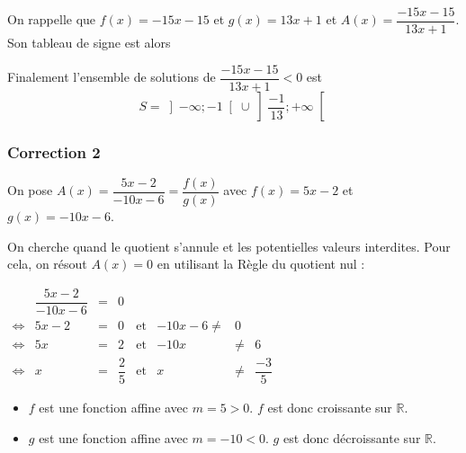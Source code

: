 \documentclass[15pt, mathserif]{beamer}
\begin{document}
\begin{frame}On rappelle que $f(x) = -15x-15$ et $g(x) = 13x+1$ et $A(x) = \dfrac{-15x-15}{13x+1}$. Son tableau de signe est alors 

\medskip \hfil
{}

 Finalement l'ensemble de solutions de $\dfrac{-15x-15}{13x+1}<0$ est\[S = \left]-\infty;-1\right[\cup\left]\dfrac{-1}{13};+\infty\right[\]

\end{frame}


\begin{frame}
\vspace{-10mm}
	\frametitle{Correction 2}
\vspace*{1cm} 
  On pose $A(x) = \dfrac{5x-2}{-10x-6} = \dfrac{f(x)}{g(x)}$ avec $f(x) = 5x-2$ et $g(x) = -10x-6$.

 On cherche quand le quotient s'annule et les potentielles valeurs interdites. Pour cela, on résout $A(x)=0$ en utilisant la Règle du quotient nul : 
 
 $\begin{array}{crclcrcl} 
 
 	  & \dfrac{5x-2}{-10x-6} & = & 0 \\ 
 	  \Leftrightarrow & 5x-2 & =& 0 & \text{et} & -10x-6\neq & 0 \\ 
 	 \Leftrightarrow & 5x&=&2& \text{et} & -10x & \neq & 6 \\ 
 	 \Leftrightarrow & x&=&\dfrac{2}{5} & \text{et} & x &\neq&\dfrac{-3}{5}
 
 \end{array}$ 
 	 \begin{itemize} 
	\item  $f$ est une fonction affine avec $m =5>0$. $f$ est donc croissante sur $\mathbb{R}$.
	\item $g$ est une fonction affine avec $m =-10<0$. $g$ est donc décroissante sur $\mathbb{R}$.

	 \end{itemize}

 \end{frame}
\end{document}
